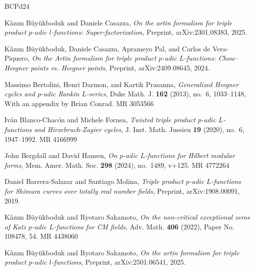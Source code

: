 \documentclass[10pt]{amsart}
\numberwithin{equation}{section}
\theoremstyle{definition}
\theoremstyle{remark} %
\begin{document}
\providecommand{\bysame}{\leavevmode\hbox to3em{\hrulefill}\thinspace}
\providecommand{\MR}{\relax\ifhmode\unskip\space\fi MR }
\providecommand{\MRhref}[2]{%
  \href{http://www.ams.org/mathscinet-getitem?mr=#1}{#2}
}
\providecommand{\href}[2]{#2}
\begin{thebibliography}{BCPd24}

Kâzım B{\"u}yükboduk and Daniele Casazza, \emph{On the artin formalism for triple product $p$-adic $l$-functions: Super-factorization}, Preprint, {arXiv}:2301.08383, 2025.

Kâzım B{\"u}yükboduk, Daniele Casazza, Aprameyo Pal, and Carlos {de Vera-Piquero}, \emph{On the {A}rtin formalism for triple product $p$-adic {$L$}-functions: {C}how--{H}eegner points vs. {H}eegner points}, Preprint, {arXiv}:2409.08645, 2024.

Massimo Bertolini, Henri Darmon, and Kartik Prasanna, \emph{Generalized {H}eegner cycles and {$p$}-adic {R}ankin {$L$}-series}, Duke Math. J. \textbf{162} (2013), no.~6, 1033--1148, With an appendix by Brian Conrad. \MR{3053566}

Iv\'an {Blanco-Chac\'on} and Michele Fornea, \emph{Twisted triple product {$p$}-adic {$L$}-functions and {H}irzebruch-{Z}agier cycles}, J. Inst. Math. Jussieu \textbf{19} (2020), no.~6, 1947--1992. \MR{4166999}

John Bergdall and David Hansen, \emph{On {$p$}-adic {$L$}-functions for {H}ilbert modular forms}, Mem. Amer. Math. Soc. \textbf{298} (2024), no.~1489, v+125. \MR{4772264}

Daniel {Barrera-Salazar} and Santiago Molina, \emph{Triple product {$ p $}-adic {$L$}-functions for {S}himura curves over totally real number fields}, Preprint, {arXiv}:1908.00091, 2019.

K\^{a}zım B\"{u}y\"{u}kboduk and Ryotaro Sakamoto, \emph{On the non-critical exceptional zeros of {K}atz {$p$}-adic {$L$}-functions for {CM} fields}, Adv. Math. \textbf{406} (2022), Paper No. 108478, 54. \MR{4438060}

Kâzım B{\"u}yükboduk and Ryotaro Sakamoto, \emph{On the artin formalism for triple product $p$-adic $l$-functions}, Preprint, {arXiv}:2501.06541, 2025.


\end{thebibliography}
\end{document}
